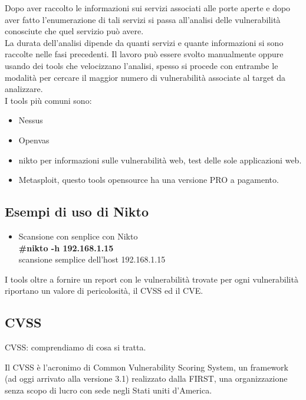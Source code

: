 \documentclass[a4paper,12pt]{article}
\begin{document}
Dopo aver raccolto le informazioni sui servizi associati alle porte aperte e dopo aver fatto l'enumerazione di tali servizi si passa all'analisi delle vulnerabilità conosciute che quel servizio può avere.\\
La durata dell'analisi dipende da quanti servizi e quante informazioni si sono raccolte nelle fasi precedenti.
Il lavoro può essere svolto manualmente oppure usando dei tools che velocizzano l'analisi, spesso si procede con entrambe le modalità per cercare il maggior numero di vulnerabilità associate al target da analizzare. \\
I tools più comuni sono:
\begin{itemize}
   
  \item Nessus\cite{nessus}
  \item Openvas \cite{openvas}
  \item nikto\cite{nikto} per informazioni sulle vulnerabilità web, test delle sole applicazioni web.
  \item Metasploit\cite{metasploit}, questo tools opensource ha una versione PRO a pagamento.
\end{itemize}

\subsection{Esempi di uso di Nikto}

\begin{itemize}

\item Scansione con senplice con Nikto \\
        \textbf{ \#nikto -h 192.168.1.15} \\
        scansione semplice dell'host 192.168.1.15
\end{itemize}


I tools oltre a fornire un report con le vulnerabilità trovate per ogni vulnerabilità riportano un valore di pericolosità, il CVSS ed il CVE.

\subsection{CVSS}

CVSS: comprendiamo di cosa si tratta.

Il CVSS\cite{CVSS} è l’acronimo di Common Vulnerability Scoring System, un framework (ad oggi arrivato alla versione 3.1) realizzato dalla FIRST\cite{First}, una organizzazione senza scopo di lucro con sede negli Stati uniti d’America.
\end{document}
